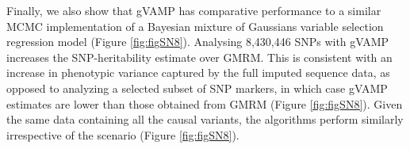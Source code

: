 Finally, we also show that gVAMP has comparative performance to a similar MCMC implementation of a Bayesian mixture of Gaussians variable selection regression model (Figure \ref{fig:figSN8}). Analysing 8,430,446 SNPs with gVAMP increases the SNP-heritability estimate over GMRM. This is consistent with an increase in phenotypic variance captured by the full imputed sequence data, as opposed to analyzing a selected subset of SNP markers, in which case gVAMP estimates are lower than those obtained from GMRM (Figure \ref{fig:figSN8}). Given the same data containing all the causal variants, the algorithms perform similarly irrespective of the scenario (Figure \ref{fig:figSN8}).

\newpage

